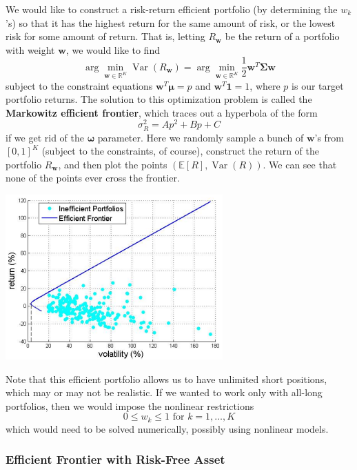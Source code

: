 \documentclass{article}
\DeclareMathOperator{\Var}{Var}
\begin{document}
\begin{definition}
We would like to construct a risk-return efficient portfolio (by determining the $w_k$'s) so that it has the highest return for the same amount of risk, or the lowest risk for some amount of return. That is, letting $R_{\mathbf{w}}$ be the return of a portfolio with weight $\mathbf{w}$, we would like to find 
\[\arg \min_{\mathbf{w} \in \mathbb{R}^K} \Var(R_{\mathbf{w}}) = \arg \min_{\mathbf{w} \in \mathbb{R}^K} \frac{1}{2} \mathbf{w}^T \boldsymbol{\Sigma} \mathbf{w}\]
subject to the constraint equations $\mathbf{w}^T \boldsymbol{\mu} = p$ and $\mathbf{w}^T \mathbf{1} = 1$, where $p$ is our target portfolio returns. The solution to this optimization problem is called the \textbf{Markowitz efficient frontier}, which traces out a hyperbola of the form 
\[\sigma^2_R = A p^2 + B p + C\]
if we get rid of the $\boldsymbol{\omega}$ parameter. Here we randomly sample a bunch of $\mathbf{w}$'s from $[0, 1]^K$ (subject to the constraints, of course), construct the return of the portfolio $R_{\mathbf{w}}$, and then plot the points $(\mathbb{E}[R], \Var(R))$. We can see that none of the points ever cross the frontier. 
\begin{center}
    \includegraphics[scale=0.65]{img/Efficient_Frontier.png}
\end{center}
\end{definition}

Note that this efficient portfolio allows us to have unlimited short positions, which may or may not be realistic. If we wanted to work only with all-long portfolios, then we would impose the nonlinear restrictions 
\[0 \leq w_k \leq 1 \text{ for } k = 1, \ldots, K\]
which would need to be solved numerically, possibly using nonlinear models. 

\subsubsection{Efficient Frontier with Risk-Free Asset}
\end{document}
